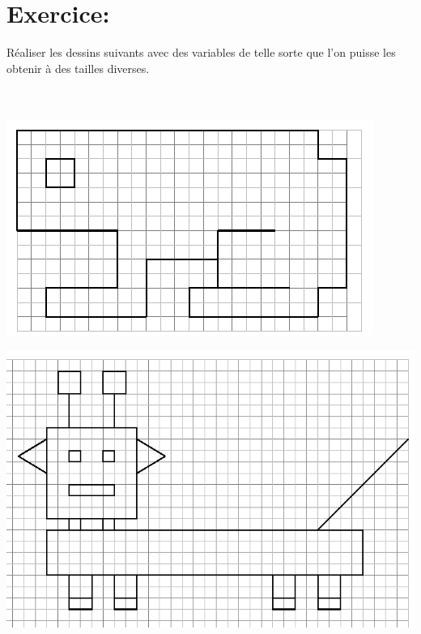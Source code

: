 \section{Exercice:}
\noindent Réaliser les dessins suivants avec des variables de telle sorte que l'on puisse les obtenir à des tailles diverses.\\ \\ \\
\begin{center}
\includegraphics[scale=0.7]{images/variables-grenouille.png}
\end{center}
\begin{center}
\includegraphics[scale=0.75]{images/variables-robot.png}
\end{center}
